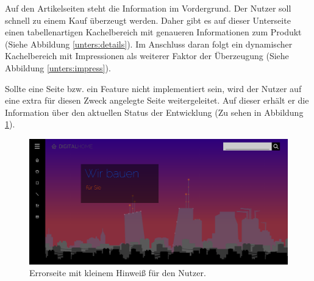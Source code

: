 Auf den Artikelseiten steht die Information im Vordergrund. Der Nutzer soll schnell zu einem Kauf überzeugt werden. Daher gibt es auf dieser Unterseite einen tabellenartigen Kachelbereich mit genaueren Informationen zum Produkt (Siehe Abbildung \ref{unters:details}). Im Anschluss daran folgt ein dynamischer Kachelbereich mit Impressionen als weiterer Faktor der Überzeugung (Siehe Abbildung \ref{unters:impress}).

Sollte eine Seite bzw. ein Feature nicht implementiert sein, wird der Nutzer auf eine extra für diesen Zweck angelegte Seite weitergeleitet. Auf dieser erhält er die Information über den aktuellen Status der Entwicklung (Zu sehen in Abbildung \ref{unters:err}).

\begin{figure} [h]
	\includegraphics[width=\textwidth]{./img/unters_err.png}
	\caption{Errorseite mit kleinem Hinweiß für den Nutzer.}
	\label{unters:err}
\end{figure}